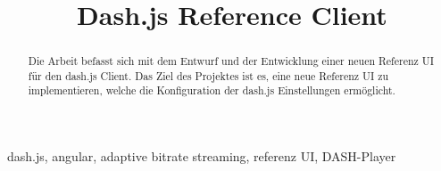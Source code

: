 \documentclass[conference]{IEEEtran}
\begin{document}
\title{Dash.js Reference Client\\}

%
%
%
%           
%



\author{
\and
{}
\and
{}
}

\maketitle

\begin{abstract}
Die Arbeit befasst sich mit dem Entwurf und der Entwicklung einer neuen Referenz UI für den dash.js Client. Das Ziel des Projektes ist es, eine neue Referenz UI zu implementieren, welche die Konfiguration der dash.js Einstellungen ermöglicht. 
\end{abstract}

\begin{IEEEkeywords}
dash.js, angular, adaptive bitrate streaming, referenz UI, DASH-Player
\end{IEEEkeywords}
\end{document}
